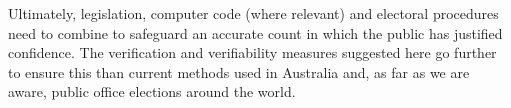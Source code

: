 Ultimately, legislation, computer code (where relevant) and
electoral procedures need to combine to safeguard an accurate count
in which the public has justified confidence. The verification and
verifiability measures suggested here go further to ensure this than
current methods used in Australia and, as far as we are aware,
public office elections around the world.


   		
		
   
	

  
    
%   
%   	
%    
%    
%		
%	  
%       
       
%       
%     
%   	 
  
	       
    
